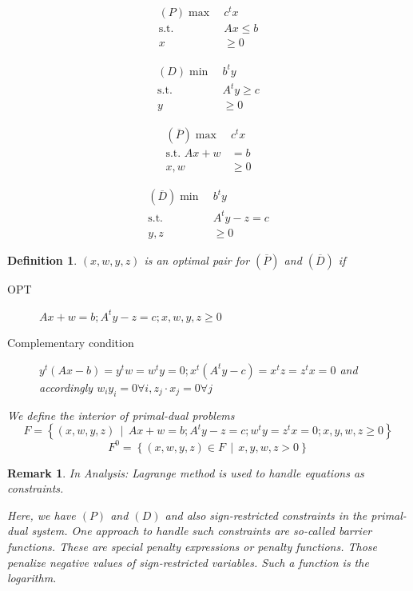\documentclass[a4paper]{article}
\numberwithin{lecref}{subsection}
\newtheorem*{Definition}{Definition}
\newtheorem*{Remark}{Remark}
\newcommand{\SetDef}[2]{\left\{#1\,\mid\,#2\right\}}
\begin{document}
\begin{minipage}{0.5\textwidth}
  \begin{align*}
  	(P) \max \:&c^t x \\
  		\text{s.t. } &Ax \leq b \\
  		x &\geq 0
  \end{align*}
\end{minipage}
\begin{minipage}{0.5\textwidth}
	\begin{align*}
		(D) \min \:&b^t y \\
		\text{s.t. } &A^t y \geq c \\
		y &\geq 0
	\end{align*}
\end{minipage}
\begin{minipage}{0.5\textwidth}
	\begin{align*}
		(\overline P) \max \:& c^t x \\
		\text{s.t. } Ax + w &= b \\
		x, w &\geq 0
	\end{align*}
\end{minipage}
\begin{minipage}{0.5\textwidth}
	\begin{align*}
		(\overline D) \min \:& b^t y \\
		\text{s.t. } & A^t y - z = c \\
		y, z &\geq 0
	\end{align*}
\end{minipage}

\begin{Definition}
	$(x, w, y, z)$ is an optimal pair for $(\overline P)$ and $(\overline D)$ if
	\begin{description}
		\item[OPT] $Ax + w = b; A^t y - z = c; x, w, y, z \geq 0$
		\item[Complementary condition] $y^t (Ax - b) = y^t w = w^t y = 0; x^t (A^t y - c) = x^t z = z^t x = 0$ and accordingly $w_i y_i = 0 \forall i, z_j \cdot x_j = 0 \forall j$
	\end{description}
	We define the interior of primal-dual problems
	\[ F = \SetDef{(x, w, y, z)}{Ax + w = b; A^t y - z = c; w^t y = z^t x = 0; x, y, w, z \geq 0} \]
	\[ F^0 = \SetDef{(x, w, y, z) \in F}{x, y, w, z > 0} \]
\end{Definition}

\begin{Remark}
	In Analysis: Lagrange method is used to handle equations as constraints.

	Here, we have $(P)$ and $(D)$ and also sign-restricted constraints in the primal-dual system.
	One approach to handle such constraints are so-called \emph{barrier functions}.
	These are special penalty expressions or penalty functions. Those penalize negative values of sign-restricted variables. Such a function is the logarithm.
\end{Remark}
\end{document}

